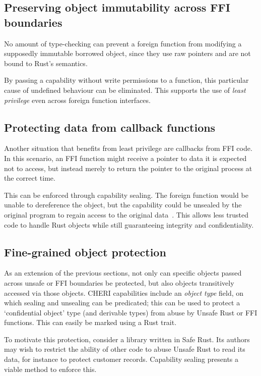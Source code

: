 \documentclass[dissertation.tex]{subfiles}
\begin{document}
\subsection{Preserving object immutability across FFI boundaries}
No amount of type-checking can prevent a foreign function from modifying
a supposedly immutable borrowed object, since they use raw pointers and
are not bound to Rust's semantics.

By passing a capability without write permissions to a function, this
particular cause of undefined behaviour can be eliminated.
This supports the use of \emph{least privilege} even across foreign
function interfaces.


\subsection{Protecting data from callback functions}
Another situation that benefits from least privilege are callbacks from
FFI code.
In this scenario, an FFI function might receive a pointer to data it is
expected not to access, but instead merely to return the pointer to the
original process at the correct time.

This can be enforced through capability sealing.
The foreign function would be unable to dereference the object, but the
capability could be unsealed by the original program to regain access to
the original data~\cite{cheri-v6}.
This allows less trusted code to handle Rust objects while still
guaranteeing integrity and confidentiality.


\subsection{Fine-grained object protection}
As an extension of the previous sections, not only can specific objects
passed across unsafe or FFI boundaries be protected, but also objects
transitively accessed via those objects.
CHERI capabilities include an \emph{object type} field, on which sealing
and unsealing can be predicated; this can be used to protect a
`confidential object' type (and derivable types) from abuse by Unsafe
Rust or FFI functions.
This can easily be marked using a Rust trait.

To motivate this protection, consider a library written in Safe Rust.
Its authors may wish to restrict the ability of other code to abuse
Unsafe Rust to read its data, for instance to protect customer records.
Capability sealing presents a viable method to enforce this.
\end{document}
